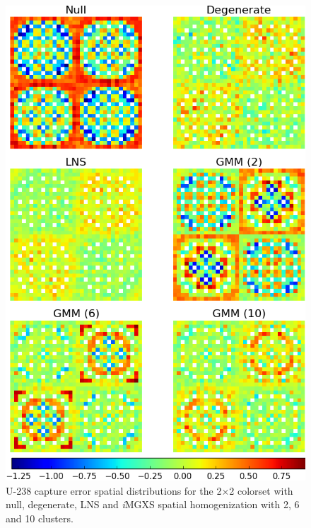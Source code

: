 \begin{figure}[h!]
\centering
\includegraphics[width=0.9\linewidth]{figures/results/spatial/2x2/capt-err}
\vspace{2mm}
\caption[U-238 capture errors for the 2$\times$2 colorset]{U-238 capture error spatial distributions for the 2$\times$2 colorset with null, degenerate, \ac{LNS} and \textit{i}\ac{MGXS} spatial homogenization with 2, 6 and 10 clusters.}
\label{fig:chap11-2x2-capt-err}
\end{figure}

\clearpage

